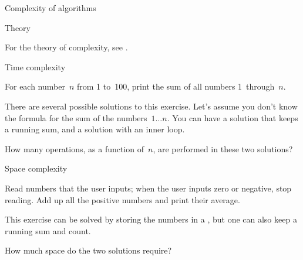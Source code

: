 
 {Complexity of algorithms}

 {Theory}

For the theory of complexity, see .

 {Time complexity}
\label{sec:time_complex}

\begin{exercise}
  For each number~$n$ from 1 to~100, print the sum of all numbers 1~through~$n$.
\end{exercise}

There are several possible solutions to this exercise. Let's assume
you don't know the formula for the sum of the numbers~$1\ldots n$.
You can have a solution that keeps a running sum, and a solution with
an inner loop.

\begin{exercise}
  How many operations, as a function of~$n$, are performed in these
  two solutions?
\end{exercise}

 {Space complexity}

\begin{exercise}
  Read numbers that the user inputs; when the user inputs zero or
  negative, stop reading. Add up all the positive numbers
  and print their average. 
\end{exercise}

This exercise can be solved by storing the numbers in a
, but one can also keep a running sum and count.

\begin{exercise}
  How much space do the two solutions require?
\end{exercise}

